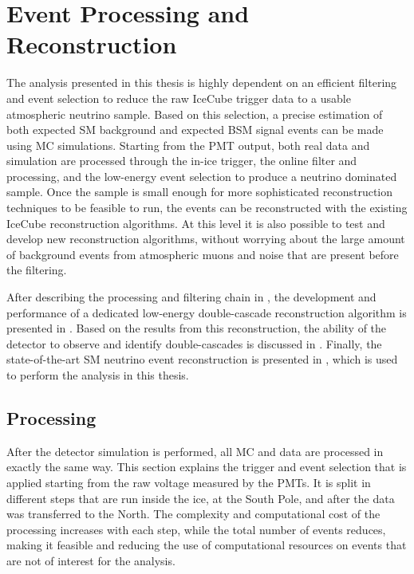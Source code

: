 \setchapterpreamble[u]{\margintoc}


\chapter{Event Processing and Reconstruction}

The analysis presented in this thesis is highly dependent on an efficient filtering and event selection to reduce the raw IceCube trigger data to a usable atmospheric neutrino sample. Based on this selection, a precise estimation of both expected SM background and expected BSM signal events can be made using MC simulations. Starting from the PMT output, both real data and simulation are processed through the in-ice trigger, the online filter and processing, and the low-energy event selection to produce a neutrino dominated sample. Once the sample is small enough for more sophisticated reconstruction techniques to be feasible to run, the events can be reconstructed with the existing IceCube reconstruction algorithms. At this level it is also possible to test and develop new reconstruction algorithms, without worrying about the large amount of background events from atmospheric muons and noise that are present before the filtering.

After describing the processing and filtering chain in , the development and performance of a dedicated low-energy double-cascade reconstruction algorithm is presented in . Based on the results from this reconstruction, the ability of the detector to observe and identify double-cascades is discussed in . Finally, the state-of-the-art SM neutrino event reconstruction is presented in , which is used to perform the analysis in this thesis.


\section{Processing} 

After the detector simulation is performed, all MC and data are processed in exactly the same way. This section explains the trigger and event selection that is applied starting from the raw voltage measured by the PMTs. It is split in different steps that are run inside the ice, at the South Pole, and after the data was transferred to the North. The complexity and computational cost of the processing increases with each step, while the total number of events reduces, making it feasible and reducing the use of computational resources on events that are not of interest for the analysis. 


